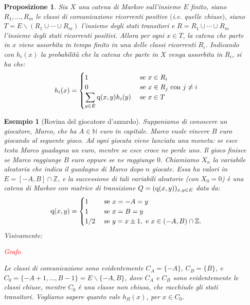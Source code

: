 \documentclass[11pt]{book}
\theoremstyle{Definizione}
\theoremstyle{TeoremaProposizioneLemmaCorollario}
\newtheorem{mypropo}[myteo]{Proposizione}
\theoremstyle{OsservazioneNota}
\newtheorem{myes}{Esempio}[section]
\newcommand{\N}{\mathbb{N}}
\newcommand{\Z}{\mathbb{Z}}
\newcommand{\tolto}{\smallsetminus}
\newcommand{\q}{\textup{q}}
\begin{document}
\begin{boxpro}
\begin{mypropo}
Sia $X$ una catena di Markov sull'insieme $E$ finito, siano $R_1,\dots,R_m$ le classi di comunicazione ricorrenti positive $($i.e. quelle chiuse$)$, siano $T = E \tolto (R_1\cup \cdots \cup R_m)$ l'insieme degli stati transitori e $R = R_1\cup \cdots \cup R_m$ l'insieme degli stati ricorrenti positivi. Allora per ogni $x\in T$, la catena che parte in $x$ viene assorbita in tempo finito in una delle classi ricorrenti $R_i$. Indicando con $h_i(x)$ la probabilità che la catena che parte in $X$ venga assorbita in $R_i$, si ha che:
$$
h_i(x) = \begin{cases}
1 &\textup{ se }x\in R_i\\
0 &\textup{ se }x\in R_j\textup{ con }j\neq i\\
\displaystyle\sum_{y\in E} \q(x,y)h_i(y) &\textup{ se }x\in T
\end{cases}
$$
\end{mypropo}
\end{boxpro}
\begin{myes}[Rovina del giocatore d'azzardo]
Supponiamo di conoscere un giocatore, Marco, che ha $A\in \N$ euro in capitale. Marco vuole vincere $B$ euro giocando al seguente gioco. Ad ogni giocata viene lanciata una moneta: se esce testa Marco guadagna un euro, mentre se esce croce ne perde uno. Il gioco finisce se Marco raggiunge $B$ euro oppure se ne raggiunge $0$. Chiamiamo $X_n$ la variabile aleatoria che indica il guadagno di Marco dopo $n$ giocate. Essa ha valori in $E = [-A,B]\cap \Z$, e la successione di tali variabili aleatorie (con $X_0 = 0$) è una catena di Markov con matrice di transizione $Q = (\q(x,y))_{x,y\in E}$ data da:
$$
\q(x,y) = \begin{cases}
1 &\textup{ se } x= -A = y\\
1 &\textup{ se }x = B = y\\
1/2 &\textup{ se }y = x\pm 1,\textup{ e }x\in (-A,B)\cap \Z.
\end{cases}
$$
Visivamente:
\begin{center}
\textcolor{red}{Grafo}
\end{center}
Le classi di comunicazione sono evidentemente $C_A = \{-A\}$, $C_B = \{B\}$, e $C_0 = \{-A+1,\dots,B-1\} = E \tolto \{-A,B\}$, dove $C_A$ e $C_B$ sono evidentemente le classi chiuse, mentre $C_0$ è una classe non chiusa, che racchiude gli stati transitori. Vogliamo sapere quanto vale $h_B(x)$, per $x\in C_0$.
\end{myes}
\end{document}
